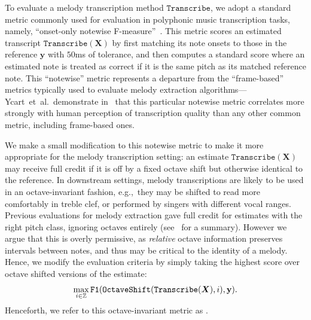 To evaluate a melody transcription method $\texttt{Transcribe}$, 
we adopt a standard metric commonly used for evaluation in polyphonic music transcription tasks, namely,  ``onset-only notewise F-measure''~\cite{ycart2020investigating}. 
This metric scores an estimated transcript $\texttt{Transcribe}(\bm{X})$ by first matching its note onsets to those in the reference $\bm{y}$ with $50$ms of tolerance, and then computes a standard \fone{} score where an estimated note is treated as correct if it is the same pitch as its matched reference note. 
This ``notewise'' metric represents a departure from the ``frame-based'' metrics typically used to evaluate melody extraction algorithms---Ycart~et~al.\ demonstrate in~\cite{ycart2020investigating} that this particular notewise metric correlates more strongly with human perception of transcription quality than any other common metric, including frame-based ones.

We make a small modification to this notewise metric to make it more appropriate for the melody transcription setting: an estimate $\texttt{Transcribe}(\bm{X})$ may receive full credit if it is off by a fixed octave shift but otherwise identical to the reference. 
In downstream settings, melody transcriptions are likely to be used in an octave-invariant fashion, e.g.,~they may be shifted to read more comfortably in treble clef, or performed by singers with different vocal ranges. 
Previous evaluations for melody extraction gave full credit for estimates with the right pitch class, ignoring octaves entirely (see~\cite{poliner2007melody} for a summary). 
However we argue that this is overly permissive, as \emph{relative} octave information preserves intervals between notes, and thus may be critical to the identity of a melody. 
Hence, we modify the evaluation criteria by simply taking the highest score over octave shifted versions of the estimate:
\begin{equation*}
    \max_{i \in \mathbb{Z}} \texttt{\texttt{F1}}(\texttt{OctaveShift}(\texttt{Transcribe}(\mbox{\boldmath{$X$}}), i), \mathbf{y}).
\end{equation*}
Henceforth, we refer to this octave-invariant metric as \fone. 
